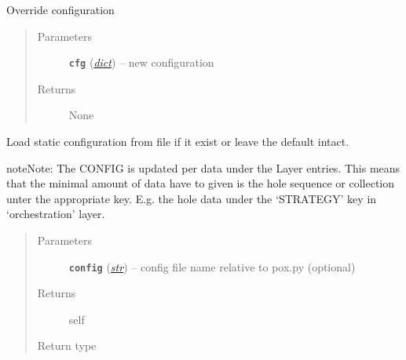 \documentclass[letterpaper,10pt,english]{sphinxmanual}
\begin{document}
\begin{fulllineitems}

\begin{fulllineitems}
\label{util/misc:escape.util.misc.ESCAPEConfig.add_cfg}
Override configuration
\begin{quote}\begin{description}
\item[{Parameters}] \leavevmode
\textbf{\texttt{cfg}} (\href{https://docs.python.org/2.7/library/stdtypes.html\#dict}{\emph{dict}}) -- new configuration

\item[{Returns}] \leavevmode
None

\end{description}\end{quote}

\end{fulllineitems}


\begin{fulllineitems}
\label{util/misc:escape.util.misc.ESCAPEConfig.load_config}
Load static configuration from file if it exist or leave the default intact.

\begin{notice}{note}{Note:}
The CONFIG is updated per data under the Layer entries. This means that
the
minimal amount of data have to given is the hole sequence or collection
unter the appropriate key. E.g. the hole data under the `STRATEGY' key in
`orchestration' layer.
\end{notice}
\begin{quote}\begin{description}
\item[{Parameters}] \leavevmode
\textbf{\texttt{config}} (\href{https://docs.python.org/2.7/library/functions.html\#str}{\emph{str}}) -- config file name relative to pox.py (optional)

\item[{Returns}] \leavevmode
self

\item[{Return type}] \leavevmode
{\hyperref[util/misc:escape.util.misc.ESCAPEConfig]{\emph{}}}

\end{description}\end{quote}


\end{fulllineitems}
\end{fulllineitems}
\end{document}
